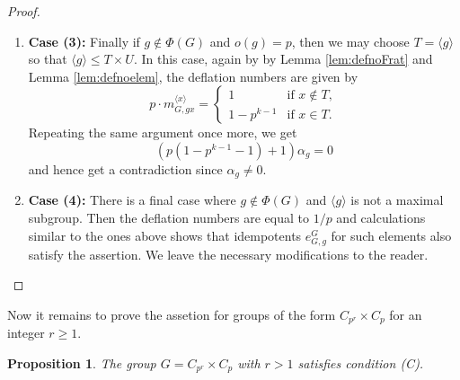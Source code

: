 \documentclass[12pt]{article}
\theoremstyle{plain}
\newtheorem{proposition}[theorem]{Proposition}
\theoremstyle{definition}
\begin{document}
\begin{proof}
\begin{enumerate}
    \item[] \textbf{Case (3):} Finally if $g\not\in\Phi(G)$ and $o(g) = p$, then we may choose $T=\langle g\rangle$ so that $\langle g\rangle \le T\times U$. In this case, again by by Lemma \ref{lem:defnoFrat} and Lemma \ref{lem:defnoelem}, the deflation numbers are given by
        \[
    p\cdot m_{G, gx}^{\langle x\rangle} = \begin{cases}
              1 & \text{if } x\not\in T,\\
            1 - p^{k-1} & \text{if } x \in T.
          \end{cases} 
    \]
    Repeating the same argument once more, we get
    \[
    (p(1-p^{k-1} -1) +1)\alpha_g = 0
    \]
    and hence get a contradiction since $\alpha_g\not = 0$.
\item[] \textbf{Case (4):} There is a final case where $g\not\in \Phi(G)$ and $\langle g\rangle$ is not a maximal subgroup. Then the deflation numbers are equal to $1/p$ and calculations similar to the ones above shows that idempotents $e_{G, g}^G$ for such elements also satisfy the assertion. We leave the necessary modifications to the reader.
\end{enumerate}
\end{proof}

Now it remains to prove the assetion for groups of the form $C_{p^r}\times C_p$ for an integer $r\ge 1$.
\begin{proposition}\label{pro:1Cp1Cpk}
    The group $G = C_{p^r}\times C_p$ with $r>1$ satisfies condition (C).
\end{proposition}
\end{document}
